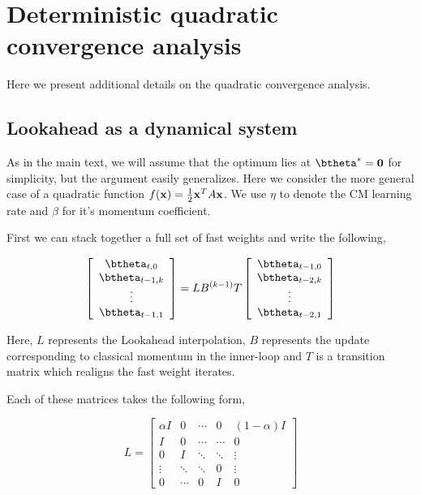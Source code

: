 \section{Deterministic quadratic convergence analysis}
\label{app:quadratic}

Here we present additional details on the quadratic convergence analysis.

\subsection{Lookahead as a dynamical system}

As in the main text, we will assume that the optimum lies at $\btheta^* = \mathbf{0}$ for simplicity, but the argument easily generalizes. Here we consider the more general case of a quadratic function $f(\mathbf{x}) = \frac{1}{2} \mathbf{x}^T A \mathbf{x}$. We use $\eta$ to denote the CM learning rate and $\beta$ for it's momentum coefficient.

First we can stack together a full set of fast weights and write the following,

\[ 
\left[\begin{array}{c}
\btheta_{t,0} \\
\btheta_{t-1, k} \\
\vdots \\
\btheta_{t-1, 1}
\end{array}\right] = LB^{(k-1)}T \left[\begin{array}{c} \btheta_{t-1, 0} \\
\btheta_{t-2, k} \\
\vdots \\
\btheta_{t-2, 1}
\end{array}\right]
\]

Here, $L$ represents the Lookahead interpolation, $B$ represents the update corresponding to classical momentum in the inner-loop and $T$ is a transition matrix which realigns the fast weight iterates.

Each of these matrices takes the following form,

\[ 
L =
\left[\begin{array}{ccccc}
\alpha I & 0 & \cdots & 0  & (1-\alpha) I \\
I & 0 & \cdots & \cdots & 0 \\
0 & I & \ddots &  \ddots & \vdots \\
\vdots & \ddots & \ddots &  0 & \vdots \\
0 & \cdots & 0 & I & 0
\end{array}\right]
\]

